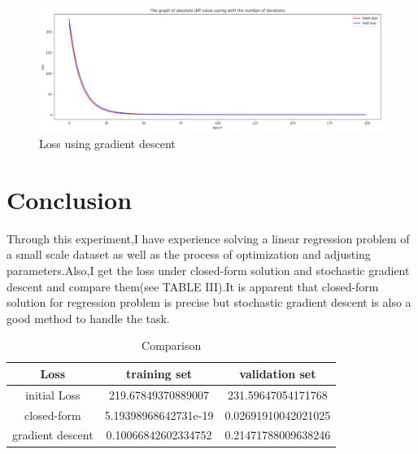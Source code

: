 \documentclass[journal, a4paper]{IEEEtran}
\begin{document}
	\begin{figure}[!hbt]
		\begin{center}
		\includegraphics[width=\columnwidth]{lab1_loss}
		\caption{Loss using gradient descent}
		\label{fig:tf_plot}
		\end{center}
	\end{figure}

\section{Conclusion}
	Through this experiment,I have experience solving a linear regression problem of a small scale dataset as well as the process of optimization and adjusting parameters.Also,I get the loss under closed-form solution and stochastic gradient descent and compare them(see TABLE III).It is apparent that closed-form solution for regression problem is precise but stochastic gradient descent is also a good method to handle the task.
\begin{table}[!hbt]
		\begin{center}
		\caption{Comparison}
		\label{tab:simParameters}
		\begin{tabular}{|c|c|c|}
			\hline
			Loss & training set & validation set\\
			\hline
			initial Loss & 219.67849370889007 & 231.59647054171768\\
			\hline
			closed-form &  5.19398968642731e-19 &  0.02691910042021025\\
			\hline
			gradient descent & 0.10066842602334752 &  0.21471788009638246\\
			\hline
		\end{tabular}
		\end{center}
	\end{table}



\end{document}
